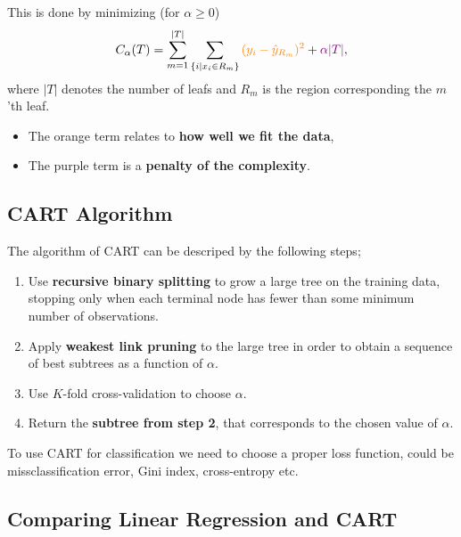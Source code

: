 \documentclass[aspectratio=169,10pt]{beamer}
\begin{document}
\begin{frame}{\secname}{\subsecname}
  This is done by minimizing (for $\alpha \geq 0$)
  \begin{align}
    C_{\alpha} (T) = \sum_{m=1}^{|T|} \sum_{ \{ i | x_i \in R_m \}} {\color{orange}(y_i - \hat{y}_{R_m})^2} + {\color{violet}\alpha | T |},
  \end{align}
  where $|T|$ denotes the number of leafs and $R_m$ is the region corresponding the $m$'th leaf.
  \begin{itemize}
    \item The {\color{orange} orange} term relates to {\color{orange}\textbf{how well we fit the data}},
    \item The {\color{violet} purple} term is a {\color{violet}\textbf{penalty of the complexity}}.
  \end{itemize}
\end{frame}

\subsection{CART Algorithm}
\begin{frame}{\secname}{\subsecname}
  The algorithm of CART can be descriped by the following steps; 
 \begin{enumerate}
     \item Use \textbf{recursive binary splitting} to grow a large tree on the training data, stopping only when each terminal node has fewer than some minimum number of observations. 
     \item Apply \textbf{weakest link pruning} to the large tree in order to obtain a sequence of best subtrees as a function of $\alpha$. 
     \item Use $K$-fold cross-validation to choose $\alpha$. 
     \item Return the \textbf{subtree from step 2}, that corresponds to the chosen value of $\alpha$. 
 \end{enumerate}
 \begingroup
 \footnotesize
 To use CART for classification we need to choose a proper loss function, could be missclassification error, Gini index, cross-entropy etc.%
 \endgroup
\end{frame}

\subsection{Comparing Linear Regression and CART}
\end{document}
